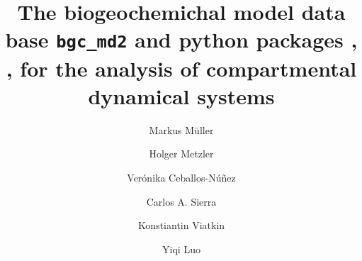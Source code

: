 
%
%

\title{The biogeochemichal model data base \texttt{bgc\_md2} and python
packages  \LAPM, \CompartmentalSystems, \ComputabilityGraphs for the analysis of compartmental dynamical systems}
%
%






\author[2]{M{arkus M{\"{u}}ller}}
\author[4]{Holger Metzler}
\author[3]{Ver{\'{o}}nika Ceballos-N{\'{u}}{\~{n}}ez}
\author[1]{Carlos A. Sierra}
\author[2]{Konstiantin Viatkin}
\author[2]{Yiqi Luo}
\affil[3]{}
\affil[4]{}

\begin{abstract} \noindent
  
\end{abstract}

